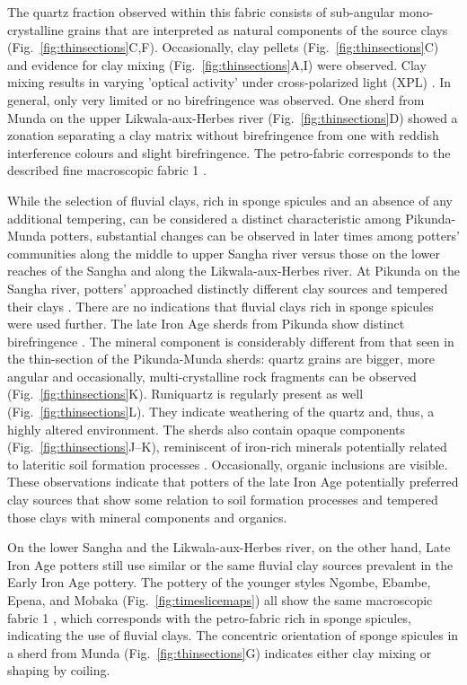 \documentclass[smallextended,natbib]{svjour3}       %
\begin{document}
The quartz fraction observed within this fabric consists of sub-angular mono-crystalline grains that are interpreted as natural components of the source clays (Fig.~\ref{fig:thinsections}C,F). Occasionally, clay pellets (Fig.~\ref{fig:thinsections}C) and evidence for clay mixing (Fig.~\ref{fig:thinsections}A,I) were observed. Clay mixing results in varying 'optical activity' under cross-polarized light (XPL) \citep{Whitbread.1986}. In general, only very limited or no birefringence was observed. One sherd from Munda on the upper Likwala-aux-Herbes river (Fig.~\ref{fig:thinsections}D) showed a zonation separating a clay matrix without birefringence from one with reddish interference colours and slight birefringence. The petro-fabric corresponds to the described fine macroscopic fabric 1 \citep[60--69]{Seidensticker.2021e}. 
 
While the selection of fluvial clays, rich in sponge spicules and an absence of any additional tempering, can be considered a distinct characteristic among Pikunda-Munda potters, substantial changes can be observed in later times among potters' communities along the middle to upper Sangha river versus those on the lower reaches of the Sangha and along the Likwala-aux-Herbes river. At Pikunda on the Sangha river, potters' approached distinctly different clay sources and tempered their clays \citep{Seidensticker.2016b,Seidensticker.2020}. There are no indications that fluvial clays rich in sponge spicules were used further. The late Iron Age sherds from Pikunda show distinct birefringence \citep[Fig.~\ref{fig:thinsections}K--L;][131--141]{Stoops.2021}. The mineral component is considerably different from that seen in the thin-section of the Pikunda-Munda sherds: quartz grains are bigger, more angular and occasionally, multi-crystalline rock fragments can be observed (Fig.~\ref{fig:thinsections}K). Runiquartz \citep[673 Fig.~6]{Marcelino.2018} is regularly present as well (Fig.~\ref{fig:thinsections}L). They indicate weathering of the quartz and, thus, a highly altered environment. The sherds also contain opaque components (Fig.~\ref{fig:thinsections}J--K), reminiscent of iron-rich minerals potentially related to lateritic soil formation processes \citep[351--352]{Scheffer.2010}. Occasionally, organic inclusions are visible. These observations indicate that potters of the late Iron Age potentially preferred clay sources that show some relation to soil formation processes and tempered those clays with mineral components and organics.

On the lower Sangha and the Likwala-aux-Herbes river, on the other hand, Late Iron Age potters still use similar or the same fluvial clay sources prevalent in the Early Iron Age pottery. The pottery of the younger styles Ngombe, Ebambe, Epena, and Mobaka (Fig.~\ref{fig:timeslicemaps}) all show the same macroscopic fabric 1 \citep[69 Tab.~12]{Seidensticker.2021e}, which corresponds with the petro-fabric rich in sponge spicules, indicating the use of fluvial clays. The concentric orientation of sponge spicules in a sherd from Munda (Fig.~\ref{fig:thinsections}G) indicates either clay mixing or shaping by coiling.
\end{document}

